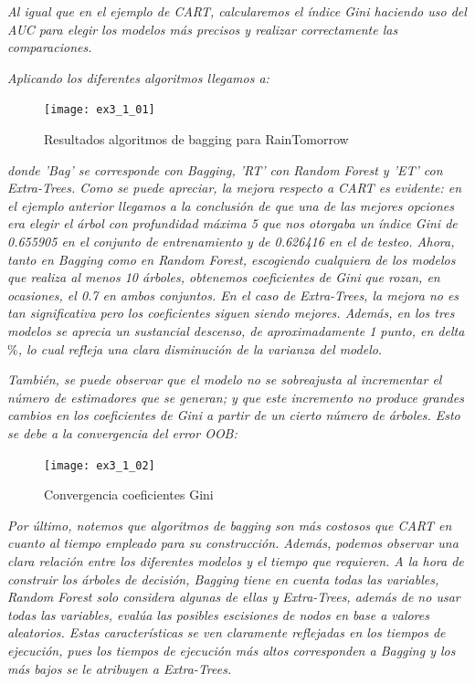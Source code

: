\documentclass[12pt,twoside]{article}
\begin{document}
\textit{Al igual que en el ejemplo de CART, calcularemos el índice Gini haciendo uso del AUC para elegir los modelos más precisos y realizar correctamente las comparaciones.}

\textit{Aplicando los diferentes algoritmos llegamos a: }

\begin{figure}[h]
\centering
\texttt{[image: ex3\_1\_01]}
\caption{Resultados algoritmos de bagging para RainTomorrow}
\end{figure}

\noindent
\textit{donde 'Bag' se corresponde con Bagging, 'RT' con Random Forest y 'ET' con Extra-Trees. Como se puede apreciar, la mejora respecto a CART es evidente: en el ejemplo anterior llegamos a la conclusión de que una de las mejores opciones era elegir el árbol con profundidad máxima 5 que nos otorgaba un índice Gini de 0.655905 en el conjunto de entrenamiento y de 0.626416 en el de testeo. Ahora, tanto en Bagging como en Random Forest, escogiendo cualquiera de los modelos que realiza al menos 10 árboles, obtenemos coeficientes de Gini que rozan, en ocasiones, el 0.7 en ambos conjuntos. En el caso de Extra-Trees, la mejora no es tan significativa pero los coeficientes siguen siendo mejores. Además, en los tres modelos se aprecia un sustancial descenso, de aproximadamente 1 punto, en delta$\%$, lo cual refleja una clara disminución de la varianza del modelo.}

\textit{También, se puede observar que el modelo no se sobreajusta al incrementar el número de estimadores que se generan; y que este incremento no produce grandes cambios en los coeficientes de Gini a partir de un cierto número de árboles. Esto se debe a la convergencia del error OOB:}


\begin{figure}[h]
\centering
\texttt{[image: ex3\_1\_02]}
\caption{Convergencia coeficientes Gini}
\end{figure}

\textit{Por último, notemos que algoritmos de bagging son más costosos que CART en cuanto al tiempo empleado para su construcción. Además, podemos observar una clara relación entre los diferentes modelos y el tiempo que requieren. A la hora de construir los árboles de decisión, Bagging tiene en cuenta todas las variables, Random Forest solo considera algunas de ellas y Extra-Trees, además de no usar todas las variables, evalúa las posibles escisiones de nodos en base a valores aleatorios. Estas características se ven claramente reflejadas en los tiempos de ejecución, pues los tiempos de ejecución más altos corresponden a Bagging y los más bajos se le atribuyen a Extra-Trees.}
\end{document}
